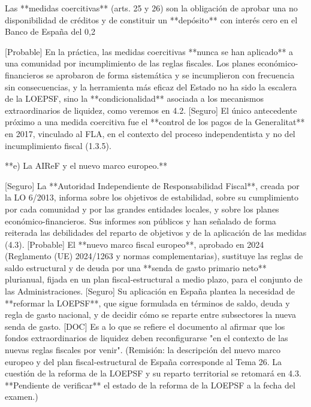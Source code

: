 \documentclass[10pt,a4paper]{article}
\begin{document}
Las **medidas coercitivas** (arts. 25 y 26) son la obligación de aprobar una no disponibilidad de créditos y de constituir un **depósito** con interés cero en el Banco de España del 0,2%

[Probable] En la práctica, las medidas coercitivas **nunca se han aplicado** a una comunidad por incumplimiento de las reglas fiscales. Los planes económico-financieros se aprobaron de forma sistemática y se incumplieron con frecuencia sin consecuencias, y la herramienta más eficaz del Estado no ha sido la escalera de la LOEPSF, sino la **condicionalidad** asociada a los mecanismos extraordinarios de liquidez, como veremos en 4.2. [Seguro] El único antecedente próximo a una medida coercitiva fue el **control de los pagos de la Generalitat** en 2017, vinculado al FLA, en el contexto del proceso independentista y no del incumplimiento fiscal (1.3.5).

**e) La AIReF y el nuevo marco europeo.**

[Seguro] La **Autoridad Independiente de Responsabilidad Fiscal**, creada por la LO 6/2013, informa sobre los objetivos de estabilidad, sobre su cumplimiento por cada comunidad y por las grandes entidades locales, y sobre los planes económico-financieros. Sus informes son públicos y han señalado de forma reiterada las debilidades del reparto de objetivos y de la aplicación de las medidas (4.3). [Probable] El **nuevo marco fiscal europeo**, aprobado en 2024 (Reglamento (UE) 2024/1263 y normas complementarias), sustituye las reglas de saldo estructural y de deuda por una **senda de gasto primario neto** plurianual, fijada en un plan fiscal-estructural a medio plazo, para el conjunto de las Administraciones. [Seguro] Su aplicación en España plantea la necesidad de **reformar la LOEPSF**, que sigue formulada en términos de saldo, deuda y regla de gasto nacional, y de decidir cómo se reparte entre subsectores la nueva senda de gasto. [DOC] Es a lo que se refiere el documento al afirmar que los fondos extraordinarios de liquidez deben reconfigurarse "en el contexto de las nuevas reglas fiscales por venir". (Remisión: la descripción del nuevo marco europeo y del plan fiscal-estructural de España corresponde al Tema 26. La cuestión de la reforma de la LOEPSF y su reparto territorial se retomará en 4.3. **Pendiente de verificar** el estado de la reforma de la LOEPSF a la fecha del examen.)
\end{document}
